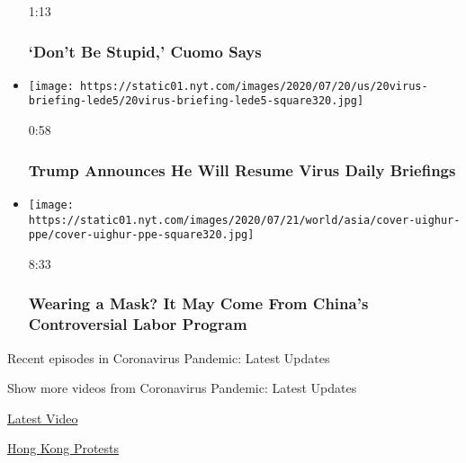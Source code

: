 \begin{itemize}
  1:13

  \hypertarget{dont-be-stupid-cuomo-says}{%
  \subsubsection{`Don't Be Stupid,' Cuomo
  Says}\label{dont-be-stupid-cuomo-says}}
\item
  \href{https://www.nytimes.com/video/us/100000007247407/trump-will-resume-virus-briefings.html?action=click\&module=video-series-bar\&region=header\&pgtype=Article\&playlistId=video/coronavirus-news-update}{}

  \texttt{[image: https://static01.nyt.com/images/2020/07/20/us/20virus-briefing-lede5/20virus-briefing-lede5-square320.jpg]}

  0:58

  \hypertarget{trump-announces-he-will-resume-virus-daily-briefings}{%
  \subsubsection{Trump Announces He Will Resume Virus Daily
  Briefings}\label{trump-announces-he-will-resume-virus-daily-briefings}}
\item
  \href{https://www.nytimes.com/video/world/asia/100000007226041/china-coronavirus-masks-uighur-labor-ppe.html?action=click\&module=video-series-bar\&region=header\&pgtype=Article\&playlistId=video/coronavirus-news-update}{}

  \texttt{[image: https://static01.nyt.com/images/2020/07/21/world/asia/cover-uighur-ppe/cover-uighur-ppe-square320.jpg]}

  8:33

  \hypertarget{wearing-a-mask-it-may-come-from-chinas-controversial-labor-program}{%
  \subsubsection{Wearing a Mask? It May Come From China's Controversial
  Labor
  Program}\label{wearing-a-mask-it-may-come-from-chinas-controversial-labor-program}}
\end{itemize}

Recent episodes in Coronavirus Pandemic: Latest Updates

Show more videos from Coronavirus Pandemic: Latest Updates

\href{/video}{}

\href{/video/latest-video}{Latest Video}

\href{/video/hk-protest}{Hong Kong Protests}

